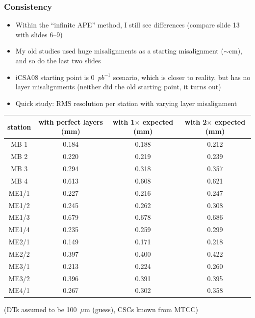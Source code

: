 \documentclass[compress]{beamer}
\begin{document}
\begin{frame}
\frametitle{Consistency}

\small
\begin{itemize}
\item Within the ``infinite APE'' method, I still see differences (compare
slide 13 with slides 6--9)
\item My old studies used huge misalignments as a starting misalignment ($\sim$cm), and so do the last two slides
\item iCSA08 starting point is 0~$pb^{-1}$ scenario, which is closer
to reality, but has no layer misalignments (neither did the old
starting point, it turns out)
\item Quick study: RMS resolution per station with varying layer misalignment
\end{itemize}

\tiny
\begin{tabular}{c c c c}
station & with perfect layers (mm) & with 1$\times$ expected (mm) & with 2$\times$ expected (mm) \\\hline
MB 1 & 0.184 & 0.188 & 0.212 \\
MB 2 & 0.220 & 0.219 & 0.239 \\
MB 3 & 0.294 & 0.318 & 0.357 \\
MB 4 & 0.613 & 0.608 & 0.621 \\
ME1/1 & 0.227 & 0.216 & 0.247 \\
ME1/2 & 0.245 & 0.262 & 0.308 \\
ME1/3 & 0.679 & 0.678 & 0.686 \\
ME1/4 & 0.235 & 0.259 & 0.299 \\
ME2/1 & 0.149 & 0.171 & 0.218 \\
ME2/2 & 0.397 & 0.400 & 0.422 \\
ME3/1 & 0.213 & 0.224 & 0.260 \\
ME3/2 & 0.396 & 0.391 & 0.395 \\
ME4/1 & 0.267 & 0.302 & 0.358 \\
\end{tabular}

(DTs assumed to be 100~$\mu$m (guess), CSCs known from MTCC)
\end{frame}
\end{document}
